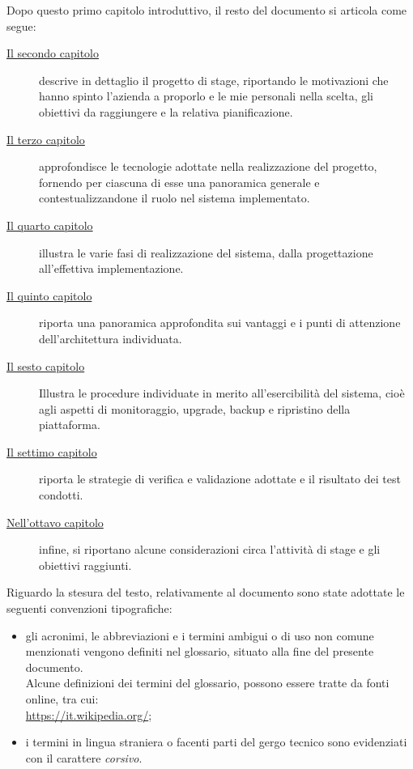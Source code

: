 Dopo questo primo capitolo introduttivo, il resto del documento si articola come segue:

\begin{description}
    
    \item[{\hyperref[cap:lo-stage]{Il secondo capitolo}}] descrive in dettaglio il progetto di stage, riportando le motivazioni che hanno spinto l'azienda a proporlo e le mie personali nella scelta, gli obiettivi da raggiungere e la relativa pianificazione.
    
    \item[{\hyperref[cap:tecnologie-adottate]{Il terzo capitolo}}] approfondisce le tecnologie adottate nella realizzazione del progetto, fornendo per ciascuna di esse una panoramica generale e contestualizzandone il ruolo nel sistema implementato.
    
    \item[{\hyperref[cap:realizzazione-del-sistema]{Il quarto capitolo}}] illustra le varie fasi di realizzazione del sistema, dalla progettazione all'effettiva implementazione.
    
    \item[{\hyperref[cap:vantaggi-e-punti-di-attenzione]{Il quinto capitolo}}]riporta una panoramica approfondita sui vantaggi e i punti di attenzione dell'architettura individuata.
    
    \item[{\hyperref[cap:esercibilità]{Il sesto capitolo}}]Illustra le procedure individuate in merito all'esercibilità del sistema, cioè agli aspetti di monitoraggio, upgrade, backup e ripristino della piattaforma.
        
    \item[{\hyperref[cap:verifica-validazione]{Il settimo capitolo}}] riporta le strategie di verifica e validazione adottate e il risultato dei test condotti.
    
    \item[{\hyperref[cap:conclusioni]{Nell'ottavo capitolo}}] infine, si riportano alcune considerazioni circa l'attività di stage e gli obiettivi raggiunti.
\end{description}

Riguardo la stesura del testo, relativamente al documento sono state adottate le seguenti convenzioni tipografiche:
\begin{itemize}
	\item gli acronimi, le abbreviazioni e i termini ambigui o di uso non comune menzionati vengono definiti nel glossario, situato alla fine del presente documento. \\
    Alcune definizioni dei termini del glossario, possono essere tratte da fonti online, tra cui: \\ 
    \url{https://it.wikipedia.org/};
	\item i termini in lingua straniera o facenti parti del gergo tecnico sono evidenziati con il carattere \emph{corsivo}.
\end{itemize}
